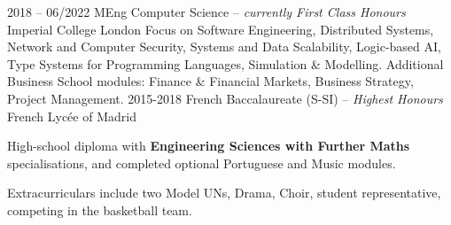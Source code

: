 \documentclass[9pt]{developercv}
\begin{document}
    \begin{entrylist}
        \entry
        {2018 -- 06/2022}
        {MEng Computer Science -- \emph{{\small currently} First Class Honours}}
        {Imperial College London}
        {
            Focus on Software Engineering,
            Distributed Systems,
            Network and Computer Security,
            Systems and Data Scalability,
            Logic-based AI,
            Type Systems for Programming Languages,
            Simulation \& Modelling.
%
            Additional Business School modules: Finance \& Financial Markets,
            Business Strategy, Project Management.
        }
        \entry
        {2015-2018}
        {French Baccalaureate (S-SI) --  \emph{Highest Honours}}
        {French Lycée of Madrid}
        {
            High-school diploma with \textbf{Engineering Sciences with Further Maths} specialisations,
            and completed optional Portuguese and Music modules.

            Extracurriculars include two Model UNs, Drama, Choir, student representative, competing in
            the basketball team.
        }
    \end{entrylist}
\end{document}

